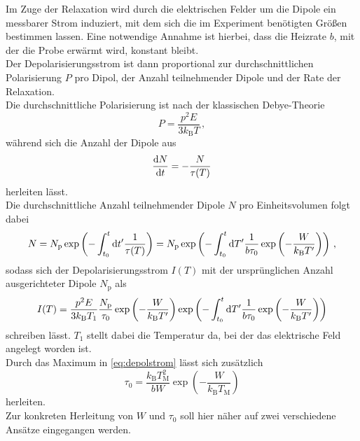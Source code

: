 Im Zuge der Relaxation wird durch die elektrischen Felder um die Dipole ein messbarer Strom induziert, mit dem sich die im Experiment benötigten Größen bestimmen lassen.
Eine notwendige Annahme ist hierbei, dass die Heizrate $b$, mit der die Probe erwärmt wird, konstant bleibt. \\
Der Depolarisierungsstrom ist dann proportional zur durchschnittlichen Polarisierung $P$ pro Dipol, der Anzahl teilnehmender Dipole und der Rate der Relaxation. \\
Die durchschnittliche Polarisierung ist nach der klassischen Debye-Theorie
\begin{equation}
    P = \frac{p^2 E}{3 k_\text{B} T} \,,
    \label{eq:durchPola}
\end{equation}
während sich die Anzahl der Dipole aus
\begin{equation}
    \frac{\mathrm{d} N}{\mathrm{d} t} = - \frac{N}{\tau(T)}
    \label{eq:AnzahlDipole}
\end{equation}
herleiten lässt. \\
Die durchschnittliche Anzahl teilnehmender Dipole $N$ pro Einheitsvolumen folgt dabei
\begin{equation}
    N = N_\text{p} \exp \left(- \int^t_{t_0} \mathrm{d} t' \frac{1}{\tau(T)}\right) =  N_\text{p} \exp \left(- \int^t_{t_0} \mathrm{d} T' \frac{1}{b \tau_0} \exp \left(-\frac{W}{k_\text{B} T'} \right)\right) \,,
    \label{eq:N}
\end{equation}
sodass sich der Depolarisierungsstrom $I(T)$ mit der ursprünglichen Anzahl ausgerichteter Dipole $N_\text{p}$ als 
\begin{equation}
    I(T) = \frac{p^2 E}{3 k_\text{B} T_1} \frac{N_\text{p}}{\tau_0}  \exp \left(-\frac{W}{k_\text{B} T'} \right) \exp \left(- \int^t_{t_0} \mathrm{d} T' \frac{1}{b \tau_0}  \exp \left(-\frac{W}{k_\text{B} T'} \right) \right)
    \label{eq:depolstrom}
\end{equation}
schreiben lässt.
$T_1$ stellt dabei die Temperatur da, bei der das elektrische Feld angelegt worden ist. \\

Durch das Maximum in \eqref{eq:depolstrom} lässt sich zusätzlich
\begin{equation*}
    \tau_0 = \frac{k_\text{B} T^2_\text{M}}{b W} \exp \left(- \frac{W}{k_\text{B} T_\text{M}}\right)
\end{equation*}
herleiten. \\

Zur konkreten Herleitung von $W$ und $\tau_0$ soll hier näher auf zwei verschiedene Ansätze eingegangen werden.

